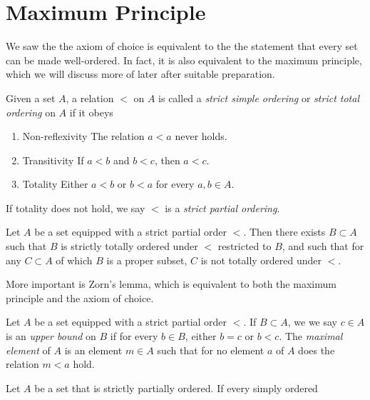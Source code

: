 \section{Maximum Principle}
We saw the the axiom of choice is equivalent to the the statement that
every set can be made well-ordered. In fact, it is also equivalent to the
maximum principle, which we will discuss more of later after suitable
preparation.
\begin{definition}
	Given a set $A$, a relation $<$ on $A$ is called a \emph{strict simple ordering}
	or \emph{strict total ordering}
	on $A$ if it obeys 
	\begin{enumerate}
		\item{Non-reflexivity} The relation $a < a$ never holds.
		\item{Transitivity} If $a < b$ and $b < c$, then $a < c$.
		\item{Totality} Either $a < b$ or $b < a$ for every $a,b \in A$.  
	\end{enumerate}
	If totality does not hold, we say $<$ is a \emph{strict partial ordering}.
\end{definition}
\begin{theorem}
	Let $A$ be a set equipped with a strict partial order $<$. Then there exists
	$B \subset A$ such that $B$ is strictly totally ordered under $<$ restricted
	to $B$, and such that for any $C \subset A$ of which $B$ is a proper subset,
	$C$ is not totally ordered under $<$.
\end{theorem}
More important is Zorn's lemma, which is equivalent to both the maximum
principle and the axiom of choice.
\begin{definition}
\label{def:zorn-def}
	Let $A$ be a set equipped with a strict partial order $<$. If $B \subset A$,
	we we say $c \in A$ is an \emph{upper bound} on $B$ if for every $b \in B$,
	either $b = c$ or $b < c$. The \emph{maximal element} of $A$ is an element
	$m \in A$ such that for no element $a$ of $A$ does the relation $m < a$ hold.
\end{definition}
\begin{theorem}
	Let $A$ be a set that is strictly partially ordered. If every simply ordered
\end{theorem}

